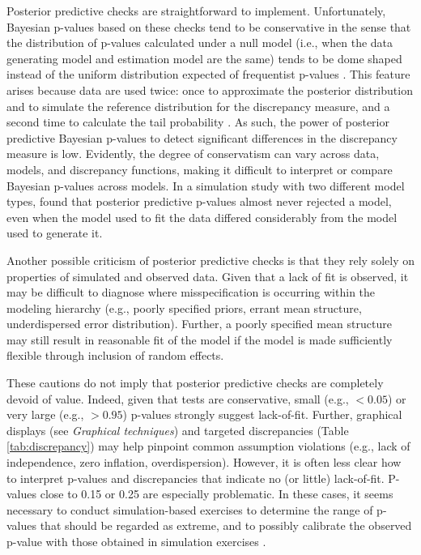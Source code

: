 \documentclass[12pt,english]{article}
\begin{document}
\begin{spacing}{1.9}
Posterior predictive checks are straightforward to implement.  Unfortunately, Bayesian p-values based on these checks tend to be conservative in the sense that the distribution of p-values calculated under a null model (i.e., when the data generating model and estimation model are the same) tends to be dome shaped instead of the uniform distribution expected of frequentist p-values \citep{RobinsEtAl2000}. This feature arises because data are used twice: once to approximate the posterior distribution and to simulate the reference distribution for the discrepancy measure, and a second time to calculate the tail probability  \citep{BayarriBerger2000}.  As such, the power of posterior predictive Bayesian p-values to detect significant differences in the discrepancy measure is low.  Evidently, the degree of conservatism can vary across data, models, and discrepancy functions, making it difficult to interpret or compare Bayesian p-values across models. In a simulation study with two different model types, \citet{Zhang2014} found that posterior predictive p-values almost never rejected a model, even when the model used to fit the data differed considerably from the model used to generate it.

Another possible criticism of posterior predictive checks is that they rely solely on properties of simulated and observed data.  Given that a lack of fit is observed, it may be difficult to diagnose where misspecification is occurring within the modeling hierarchy (e.g., poorly specified priors, errant mean structure, underdispersed error distribution).  Further, a poorly specified mean structure may still result in reasonable fit of the model if the model is made sufficiently flexible through inclusion of random effects.

These cautions do not imply that posterior predictive checks are completely devoid of value.  Indeed, given that tests are conservative, small (e.g., $<0.05$) or very large (e.g., $>0.95$) p-values strongly suggest lack-of-fit.  Further, graphical displays (see \textit{Graphical techniques}) and targeted discrepancies (Table \ref{tab:discrepancy}) may help pinpoint common assumption violations (e.g., lack of independence, zero inflation, overdispersion).  However, it is often less clear how to interpret p-values and discrepancies that indicate no (or little) lack-of-fit. P-values close to 0.15 or 0.25 are especially problematic.  In these cases, it seems necessary to conduct simulation-based exercises to determine the range of p-values that should be regarded as extreme, and to possibly calibrate the observed p-value with those obtained in simulation exercises \citep[e.g.,][]{DeyEtAl1998,HjortEtAl2006}.


\end{spacing}
\end{document}
